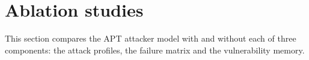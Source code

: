 \documentclass{cshonours}
\newcommand{\prelim}[1]{#1}
\begin{document}
\section{Ablation studies}
\label{sec:ablation}
\suppressfloats[t]

This section compares the APT attacker model with and without each of three
components: the attack profiles, the failure matrix and the vulnerability
memory.
\end{document}
